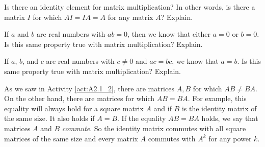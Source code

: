 \begin{activity}
\item Is there an identity element for matrix multiplication? In other words, is there a matrix $I$ for which $AI=IA=A$ for any matrix $A$? Explain.


    
	\item If $a$ and $b$ are real numbers with $ab=0$, then we know that either $a=0$ or $b=0$. Is this same property true with matrix multiplication? Explain. 
	


	\item If $a$, $b$, and $c$ are real numbers with $c \neq 0$ and $ac = bc$, we know that $a=b$. Is this same property true with matrix multiplication?  Explain.
	
	
	
	
    \ea
\end{activity}



As we saw in Activity \ref{act:A2.1_2}, there are matrices $A, B$ for which $AB\neq BA$. On the other hand, there are matrices for which $AB=BA$. For example, this equality will always hold for a square matrix $A$ and if $B$ is the identity matrix of the same size. It also holds if $A=B$. If the equality $AB=BA$ holds, we say that matrices $A$ and $B$ \emph{commute}. So the identity matrix commutes with all square matrices of the same size and every matrix $A$ commutes with $A^k$ for any power $k$.



